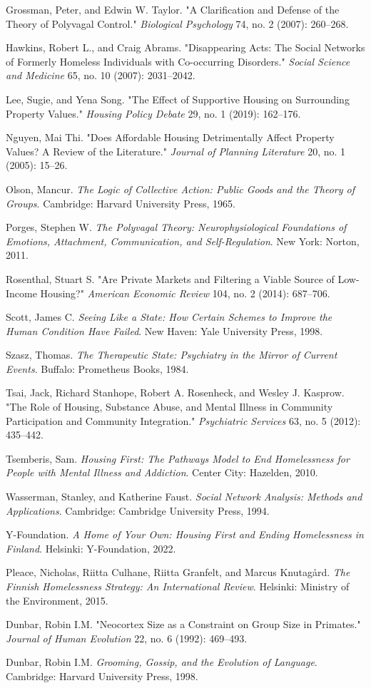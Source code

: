 \documentclass[12pt, letterpaper]{article}
\begin{document}
Grossman, Peter, and Edwin W. Taylor. "A Clarification and Defense of the Theory of Polyvagal Control." \textit{Biological Psychology} 74, no. 2 (2007): 260–268.

Hawkins, Robert L., and Craig Abrams. "Disappearing Acts: The Social Networks of Formerly Homeless Individuals with Co-occurring Disorders." \textit{Social Science and Medicine} 65, no. 10 (2007): 2031–2042.

Lee, Sugie, and Yena Song. "The Effect of Supportive Housing on Surrounding Property Values." \textit{Housing Policy Debate} 29, no. 1 (2019): 162–176.

Nguyen, Mai Thi. "Does Affordable Housing Detrimentally Affect Property Values? A Review of the Literature." \textit{Journal of Planning Literature} 20, no. 1 (2005): 15–26.

Olson, Mancur. \textit{The Logic of Collective Action: Public Goods and the Theory of Groups}. Cambridge: Harvard University Press, 1965.

Porges, Stephen W. \textit{The Polyvagal Theory: Neurophysiological Foundations of Emotions, Attachment, Communication, and Self-Regulation}. New York: Norton, 2011.

Rosenthal, Stuart S. "Are Private Markets and Filtering a Viable Source of Low-Income Housing?" \textit{American Economic Review} 104, no. 2 (2014): 687–706.

Scott, James C. \textit{Seeing Like a State: How Certain Schemes to Improve the Human Condition Have Failed}. New Haven: Yale University Press, 1998.

Szasz, Thomas. \textit{The Therapeutic State: Psychiatry in the Mirror of Current Events}. Buffalo: Prometheus Books, 1984.

Tsai, Jack, Richard Stanhope, Robert A. Rosenheck, and Wesley J. Kasprow. "The Role of Housing, Substance Abuse, and Mental Illness in Community Participation and Community Integration." \textit{Psychiatric Services} 63, no. 5 (2012): 435–442.

Tsemberis, Sam. \textit{Housing First: The Pathways Model to End Homelessness for People with Mental Illness and Addiction}. Center City: Hazelden, 2010.

Wasserman, Stanley, and Katherine Faust. \textit{Social Network Analysis: Methods and Applications}. Cambridge: Cambridge University Press, 1994.

Y-Foundation. \textit{A Home of Your Own: Housing First and Ending Homelessness in Finland}. Helsinki: Y-Foundation, 2022.

Pleace, Nicholas, Riitta Culhane, Riitta Granfelt, and Marcus Knutagård. \textit{The Finnish Homelessness Strategy: An International Review}. Helsinki: Ministry of the Environment, 2015.

Dunbar, Robin I.M. "Neocortex Size as a Constraint on Group Size in Primates." \textit{Journal of Human Evolution} 22, no. 6 (1992): 469--493.

Dunbar, Robin I.M. \textit{Grooming, Gossip, and the Evolution of Language}. Cambridge: Harvard University Press, 1998.
\end{document}
